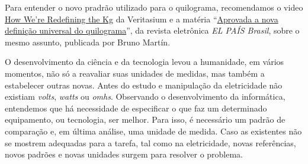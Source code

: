 \know{}
\label{\detokenize{NO103-0:para-saber-mais}}
Para entender o novo pradrão utilizado para o quilograma, recomendamos o video \href{https://youtu.be/Oo0jm1PPRuo}{How We’re Redefining the Kg} da Veritasium e a matéria “\href{https://brasil.elpais.com/brasil/2018/11/13/ciencia/1542109733\_360096.html}{Aprovada a nova definição universal do quilograma}”, da revista eletrônica \emph{EL PAÍS Brasil}, sobre o mesmo assunto, publicada por Bruno Martín.


\label{\detokenize{NO103-1:explorando-medidas-informatica-e-informacao}}\label{\detokenize{NO103-1::doc}}


O desenvolvimento da ciência e da tecnologia levou a humanidade, em vários momentos, não só a reavaliar suas unidades de medidas, mas também a estabelecer outras novas. Antes do estudo e manipulação da eletricidade não existiam \emph{volts}, \emph{watts} ou \emph{omhs}. Observando o desenvolvimento da informática, entendemos que há necessidade de especificar o que faz um determinado equipamento, ou tecnologia, ser melhor. Para isso, é necessário um padrão de comparação e, em última análise, uma unidade de medida. Caso as existentes não se mostrem adequadas para a tarefa, tal como na eletricidade, novas referências, novos padrões e novas unidades surgem para resolver o problema.

